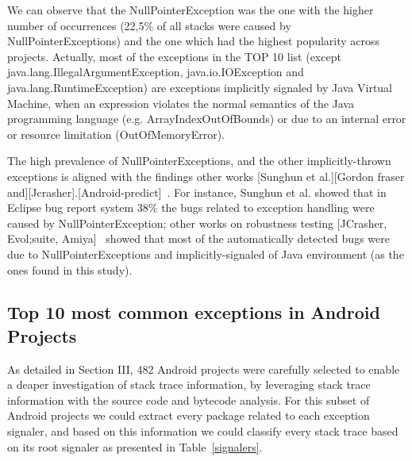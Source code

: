 \documentclass[conference]{IEEEtran}
\begin{document}
We can observe that the NullPointerException was the one with the higher number
of occurrences (22,5\% of all stacks were caused by NullPointerExceptions) and
the one which had the highest popularity across projects. Actually, most of the
exceptions in the TOP 10 list (except java.lang.IllegalArgumentException,
java.io.IOException and java.lang.RuntimeException) are exceptions implicitly
signaled by Java Virtual Machine, when an expression violates the normal
semantics of the Java programming language (e.g. ArrayIndexOutOfBounds) or due
to an internal error or resource limitation (OutOfMemoryError).

The high prevalence of NullPointerExceptions, and the other implicitly-thrown
exceptions  is aligned with the findings other works [Sunghun et al.][Gordon
fraser and][Jcrasher].[Android-predict]~. For instance, Sunghun et
al. showed that in Eclipse bug report system 38\% the bugs related to exception
handling were caused by NullPointerException; other works on robustness testing
[JCrasher, Evol;suite, Amiya]~ showed that most of the automatically
detected bugs were due to NullPointerExceptions and implicitly-signaled of Java
environment (as the ones found in this study).


\subsection{Top 10 most common exceptions in Android Projects}

As detailed in Section III, 482 Android projects were carefully selected to
enable a deaper investigation of stack trace information, by leveraging stack
trace information with the source code and bytecode analysis. For this subset of
Android projects we could extract every package related to each exception
signaler, and based on this information we could classify every stack trace
based on its root signaler as presented in Table~\ref{signalers}.
\end{document}

